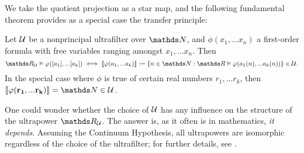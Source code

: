\documentclass[draft.tex]{subfiles}
\begin{document}
We take the quotient projection as a star map, and the following fundamental theorem provides as a special case the transfer principle:
\begin{theorem}[Łoś]
Let $\mathcal{U}$ be a nonprincipal ultrafilter over $\NN$, and $\phi(x_1, ... x_n)$ a first-order formula with free variables ranging amongst $x_1, ... x_n$. Then
\begin{equation*}
    \RR_{\cl{U}} \vDash \phi([a_1], ... [a_k]) \iff \llbracket \phi(a_1, ... a_k) \rrbracket := \{n \in \NN: \RR \vDash \phi(a_1(n), ... a_k(n))\} \in \cl{U}.
\end{equation*}
In the special case where $\phi$ is true of certain real numbers $r_1, ... r_k$, then $\llbracket \phi(\mathbf{r_1},...\mathbf{r_k}) \rrbracket = \NN \in \cl{U}$.
\end{theorem}
\begin{remark}
One could wonder whether the choice of $\mathcal{U}$ has any influence on the structure of the ultrapower $\RR_{\cl{U}}$. The answer is, as it often is in mathematics, \textit{it depends}. Assuming the Continuum Hypothesis, all ultrapowers are isomorphic regardless of the choice of the ultrafilter; for further details, see \cite{mse}.
\end{remark}
\end{document}
